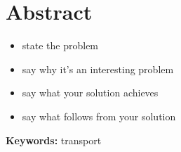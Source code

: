 %
%

\chapter*{\hfill Abstract \hfill}

\vspace{1cm plus 0.5cm}

\makeatletter
\begin{center}
 \large{\textbf{\@englishtitle}}
\end{center}
\makeatother

\vspace{0.75cm plus 0.5cm}



\begin{itemize}
\tightlist
\item
  state the problem
\item
  say why it's an interesting problem
\item
  say what your solution achieves
\item
  say what follows from your solution
\end{itemize}

\noindent
\lipsum[14]

\vspace{\fill}

\begin{small}
\noindent\textsf{\textbf{Keywords:}
transport}
\end{small}

\thispagestyle{empty}

